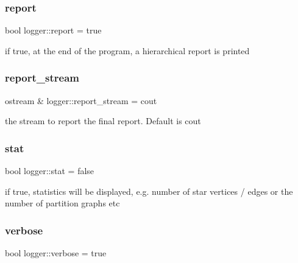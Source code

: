 \subsubsection{\texorpdfstring{report}{report}}
{\footnotesize\ttfamily bool logger\+::report = true\hspace{0.3cm}{\ttfamily [static]}}



if true, at the end of the program, a hierarchical report is printed 

\mbox{\label{classlogger_a8490b3400a43c9c6f3cc3cc122f10996}} 
\subsubsection{\texorpdfstring{report\+\_\+stream}{report\_stream}}
{\footnotesize\ttfamily ostream \& logger\+::report\+\_\+stream = cout\hspace{0.3cm}{\ttfamily [static]}}



the stream to report the final report. Default is cout 

\mbox{\label{classlogger_a26812b5ba03f130e8dae3446d5fc032f}} 
\subsubsection{\texorpdfstring{stat}{stat}}
{\footnotesize\ttfamily bool logger\+::stat = false\hspace{0.3cm}{\ttfamily [static]}}



if true, statistics will be displayed, e.\+g. number of star vertices / edges or the number of partition graphs etc 

\mbox{\label{classlogger_aab3c778c044ddf4b1b5fad8f4c230ff9}} 
\subsubsection{\texorpdfstring{verbose}{verbose}}
{\footnotesize\ttfamily bool logger\+::verbose = true\hspace{0.3cm}{\ttfamily [static]}}



